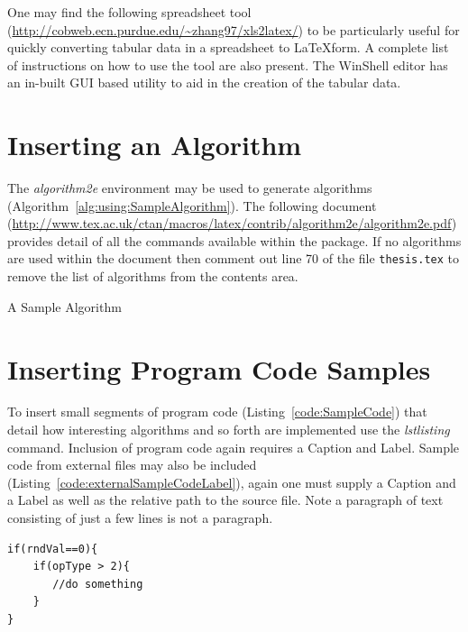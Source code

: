 One may find the following spreadsheet tool (\url{http://cobweb.ecn.purdue.edu/~zhang97/xls2latex/}) to be particularly useful for quickly converting tabular data in a spreadsheet to \LaTeX \space form. A complete list of instructions on how to use the tool are also present. The WinShell editor has an in-built GUI based utility to aid in the creation of the tabular data.

\section{Inserting an Algorithm}

The \emph{algorithm2e} environment may be used to generate algorithms (Algorithm~\ref{alg:using:SampleAlgorithm}). The following document (\url{http://www.tex.ac.uk/ctan/macros/latex/contrib/algorithm2e/algorithm2e.pdf}) provides detail of all the commands available within the package. If no algorithms are used within the document then comment out line 70 of the file {\tt thesis.tex} to remove the list of algorithms from the contents area.

\begin{algorithm}
{}
\caption{A Sample Algorithm} \label{alg:using:SampleAlgorithm}
\end{algorithm}

\section{Inserting Program Code Samples}

To insert small segments of program code (Listing~\ref{code:SampleCode}) that detail how interesting algorithms and so forth are implemented use the \emph{lstlisting} command. Inclusion of program code again requires a Caption and Label. Sample code from external files may also be included (Listing~\ref{code:externalSampleCodeLabel}), again one must supply a Caption and a Label as well as the relative path to the source file. Note a paragraph of text consisting of just a few lines is not a paragraph.



\begin{lstlisting}[caption=Sample Program Code Listing, label=code:SampleCode]
if(rndVal==0){
    if(opType > 2){
       //do something
    }
}
\end{lstlisting}





